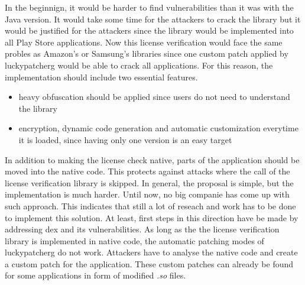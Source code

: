 In the beginnign, it would be harder to find vulnerabilities than it was with the Java version.
It would take some time for the attackers to crack the library but it would be justified for the attackers since the library would be implemented into all Play Store applications.
Now this license verification would face the same probles as Amazon's or Samsung's libraries since one custom patch applied by \gls{luckypatcherg} would be able to crack all applications.
For this reason, the implementation should include two essential features.
\begin{itemize}
\item heavy obfuscation should be applied since users do not need to understand the library
\item encryption, dynamic code generation and automatic customization everytime it is loaded, since having only one version is an easy target
\end{itemize}
\newline
In addition to making the license check native, parts of the application should be moved into the native code.
This protects against attacks where the call of the license verification library is skipped.
\newline
In general, the proposal is simple, but the implementation is much harder.
Until now, no big companie has come up with such approach.
This indicates that still a lot of reseach and work has to be done to implement this solution.
At least, first steps in this direction have be made by addressing dex and its vulnerabilities. \cite{munteanLicense}
\newline
As long as the the license verification library is implemented in native code, the automatic patching modes of \gls{luckypatcherg} do not work.
Attackers have to analyse the native code and create a custom patch for the application.
These custom patches can already be found for some applications in form of modified \textit{.so} files.
